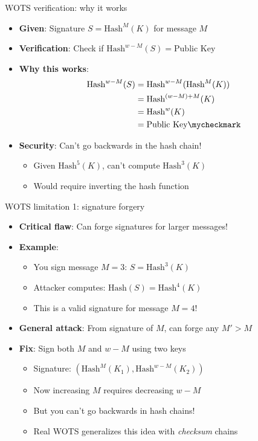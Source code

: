 \ifdefined\PRESENTATION\else\PassOptionsToClass{handout}{beamer}\fi\documentclass[aspectratio=169, lualatex]{beamer}
\begin{document}
\begin{frame}{WOTS verification: why it works}
	\begin{itemize}
		\item \textbf{Given}: Signature $S = \text{Hash}^M(K)$ for message $M$
		\item \textbf{Verification}: Check if $\text{Hash}^{w-M}(S) = \text{Public Key}$
		\item \textbf{Why this works}:
		      \begin{align*}
			      \text{Hash}^{w-M}(S) & = \text{Hash}^{w-M}(\text{Hash}^M(K)) \\
			                           & = \text{Hash}^{(w-M)+M}(K)            \\
			                           & = \text{Hash}^w(K)                    \\
			                           & = \text{Public Key} \mycheckmark
		      \end{align*}
		\item \textbf{Security}: Can't go backwards in the hash chain!
		      \begin{itemize}
			      \item Given $\text{Hash}^5(K)$, can't compute $\text{Hash}^3(K)$
			      \item Would require inverting the hash function
		      \end{itemize}
	\end{itemize}
\end{frame}

\begin{frame}{WOTS limitation 1: signature forgery}
	\begin{itemize}
		\item \textbf{Critical flaw}: Can forge signatures for larger messages!
		\item \textbf{Example}:
		      \begin{itemize}
			      \item You sign message $M = 3$: $S = \text{Hash}^3(K)$
			      \item Attacker computes: $\text{Hash}(S) = \text{Hash}^4(K)$
			      \item This is a valid signature for message $M = 4$!
		      \end{itemize}
		\item \textbf{General attack}: From signature of $M$, can forge any $M' > M$
		\item \textbf{Fix}: Sign both $M$ and $w-M$ using two keys
		      \begin{itemize}
			      \item Signature: $(\text{Hash}^M(K_1), \text{Hash}^{w-M}(K_2))$
			      \item Now increasing $M$ requires decreasing $w-M$
			      \item But you can't go backwards in hash chains!
			      \item Real WOTS generalizes this idea with \textit{checksum} chains
		      \end{itemize}
	\end{itemize}
\end{frame}
\end{document}
